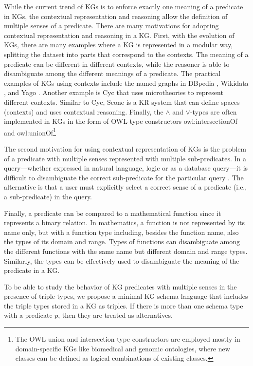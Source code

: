 \documentclass[runningheads]{llncs}
\begin{document}
While the current trend of KGs is to enforce exactly one meaning of a
predicate in KGs, the contextual representation and reasoning allow
the definition of multiple senses of a predicate. There are many
motivations for adopting contextual representation and reasoning in a
KG. First, with the evolution of KGs, there are many examples where a
KG is represented in a modular way, splitting the dataset into parts
that correspond to the contexts. The meaning of a predicate can be
different in different contexts, while the reasoner is able to
disambiguate among the different meanings of a predicate.  The
practical examples of KGs using contexts include the named graphs in
DBpedia \cite{Auer2007}, Wikidata \cite{vrandecic2014}, and Yago
\cite{Hoffart2013}. Another example is Cyc \cite{cyc} that uses
microtheories to represent different contexts. Similar to Cyc, Scone
\cite{Fahlman2011} is a KR system that can define spaces (contexts)
and uses contextual reasoning. Finally, the $\land$ and $\lor$-types
are often implemented in KGs in the form of OWL type constructors
owl:intersectionOf and owl:unionOf\footnote{The OWL union and
  intersection type constructors are employed mostly in
  domain-specific KGs like biomedical and genomic ontologies, where new
  classes can be defined as logical combinations of existing classes.}

The second motivation for using contextual representation of KGs is
the problem of a predicate with multiple senses represented with
multiple sub-predicates. In a query---whether expressed in natural
language, logic or as a database query---it is difficult to
disambiguate the correct sub-predicate for the particular query
\cite{cyc}. The alternative is that a user must explicitly select a
correct sense of a predicate (i.e., a sub-predicate) in the query.

Finally, a predicate can be compared to a mathematical function since
it represents a binary relation. In mathematics, a function is not
represented by its name only, but with a function type including,
besides the function name, also the types of its domain and
range. Types of functions can disambiguate among the different
functions with the same name but different domain and range
types. Similarly, the types can be effectively used to disambiguate
the meaning of the predicate in a KG.

To be able to study the behavior of KG predicates with multiple senses
in the presence of triple types, we propose a minimal KG schema
language that includes the triple types stored in a KG as triples. If
there is more than one schema type with a predicate $p$, then they are
treated as alternatives.
\end{document}
